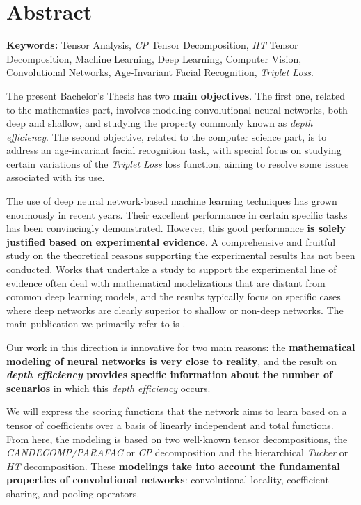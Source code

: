 %

\chapter{Abstract}


\textbf{Keywords:} Tensor Analysis, \textit{CP} Tensor Decomposition, \textit{HT} Tensor Decomposition, Machine Learning, Deep Learning, Computer Vision, Convolutional Networks, Age-Invariant Facial Recognition, \textit{Triplet Loss}.

The present Bachelor's Thesis has two \textbf{main objectives}. The first one, related to the mathematics part, involves modeling convolutional neural networks, both deep and shallow, and studying the property commonly known as \textit{depth efficiency}. The second objective, related to the computer science part, is to address an age-invariant facial recognition task, with special focus on studying certain variations of the \textit{Triplet Loss} loss function, aiming to resolve some issues associated with its use.

The use of deep neural network-based machine learning techniques has grown enormously in recent years. Their excellent performance in certain specific tasks has been convincingly demonstrated. However, this good performance \textbf{is solely justified based on experimental evidence}. A comprehensive and fruitful study on the theoretical reasons supporting the experimental results has not been conducted. Works that undertake a study to support the experimental line of evidence often deal with mathematical modelizations that are distant from common deep learning models, and the results typically focus on specific cases where deep networks are clearly superior to shallow or non-deep networks. The main publication we primarily refer to is \cite{matematicas:principal}.

Our work in this direction is innovative for two main reasons: the \textbf{mathematical modeling of neural networks is very close to reality}, and the result on \textbf{\textit{depth efficiency} provides specific information about the number of scenarios} in which this \textit{depth efficiency} occurs.

We will express the scoring functions that the network aims to learn based on a tensor of coefficients over a basis of linearly independent and total functions. From here, the modeling is based on two well-known tensor decompositions, the \textit{CANDECOMP/PARAFAC} or \textit{CP} decomposition and the hierarchical \textit{Tucker} or \textit{HT} decomposition. These \textbf{modelings take into account the fundamental properties of convolutional networks}: convolutional locality, coefficient sharing, and pooling operators.

